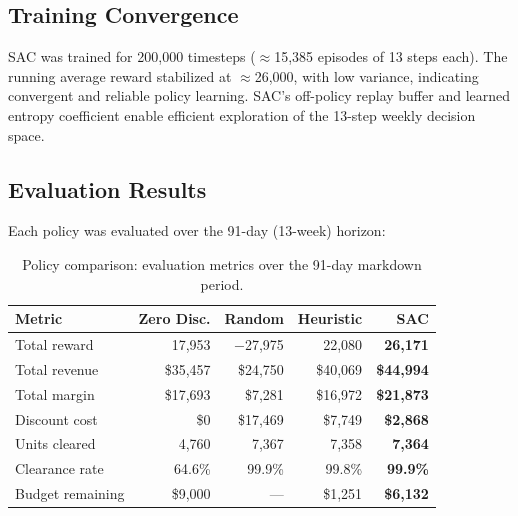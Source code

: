 \documentclass[11pt,a4paper]{article}
\begin{document}
\subsection{Training Convergence}

SAC was trained for 200,000 timesteps ($\approx$15,385 episodes of 13 steps each).
The running average reward stabilized at $\approx$26,000, with low variance, indicating convergent and reliable policy learning.
SAC's off-policy replay buffer and learned entropy coefficient enable efficient exploration of the 13-step weekly decision space.

\subsection{Evaluation Results}

Each policy was evaluated over the 91-day (13-week) horizon:

\begin{table}[H]
\centering
\caption{Policy comparison: evaluation metrics over the 91-day markdown period.}
\begin{tabular}{@{}lrrrr@{}}
\toprule
\textbf{Metric} & \textbf{Zero Disc.} & \textbf{Random} & \textbf{Heuristic} & \textbf{SAC} \\
\midrule
Total reward      &  17,953  & $-$27,975 &  22,080 &  \textbf{26,171} \\
Total revenue     &  \$35,457  &  \$24,750 &  \$40,069 &  \textbf{\$44,994} \\
Total margin      &  \$17,693  &  \$7,281 &  \$16,972 &  \textbf{\$21,873} \\
Discount cost     &  \$0  &  \$17,469 &  \$7,749 &  \textbf{\$2,868} \\
Units cleared     &   4,760   &   7,367  &   7,358  &      \textbf{7,364} \\
Clearance rate    &   64.6\%   &   99.9\%  &    99.8\%  &       \textbf{99.9\%} \\
Budget remaining  &   \$9,000  &     --- &     \$1,251 &  \textbf{\$6,132} \\
\bottomrule
\end{tabular}
\end{table}

\end{document}
